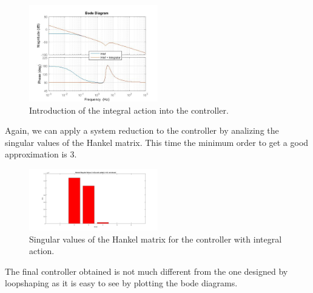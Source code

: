 \begin{figure}[H]
\includegraphics[width=0.5\textwidth]{img/hinf_integrator.jpg}
\caption{Introduction of the integral action into the controller.}
\end{figure}

Again, we can apply a system reduction to the controller by analizing the singular values of the Hankel matrix. This time the minimum order to get a good approximation is 3.\\

\begin{figure}[H]
\includegraphics[width=0.5\textwidth]{img/hinf_hankel_int.jpg}
\caption{Singular values of the Hankel matrix for the controller with integral action.}
\end{figure}

The final controller obtained is not much different from the one designed by loopshaping as it is easy to see by plotting the bode diagrams.

